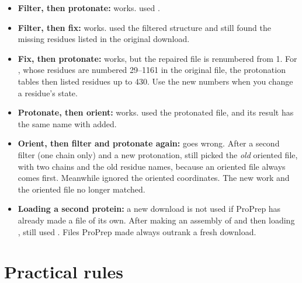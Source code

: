 \begin{itemize}
  \item \textbf{Filter, then protonate:} works.  used
  .
  \item \textbf{Filter, then fix:} works.  used the filtered structure
  and still found the missing residues listed in the original download.
  \item \textbf{Fix, then protonate:} works, but the repaired file is
  renumbered from 1. For , whose residues are numbered 29--1161 in the
  original file, the protonation tables then listed residues up to 430. Use the
  new numbers when you change a residue's state.
  \item \textbf{Protonate, then orient:} works.  used the protonated
  file, and its result has the same name with  added.
  \item \textbf{Orient, then filter and protonate again:} goes wrong. After a
  second filter (one chain only) and a new protonation,  still picked the
  \emph{old} oriented file, with two chains and the old residue names, because
  an oriented file always comes first. Meanwhile  ignored the oriented
  coordinates. The new work and the oriented file no longer matched.
  \item \textbf{Loading a second protein:} a new download is not used if ProPrep
  has already made a file of its own. After making an assembly of 
  and then loading ,  still used
  . Files ProPrep made always outrank a fresh
  download.
\end{itemize}

\section{Practical rules}\label{sec:projectfolder-rules}

